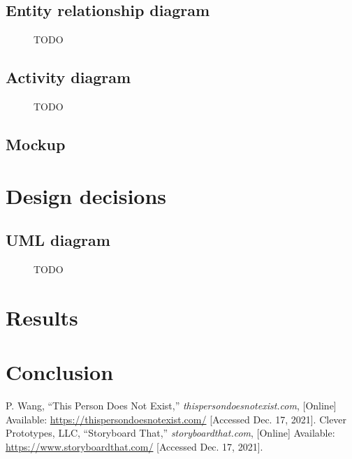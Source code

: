 \documentclass[conference]{IEEEtran}
\begin{document}
\subsection{Entity relationship diagram}

\begin{figure}[H]
	\centerline{}
	\caption{TODO}
	\label{fig:entity_relationship_diagram}
\end{figure}

\subsection{Activity diagram}

\begin{figure}[H]
	\centerline{}
	\caption{TODO}
	\label{fig:activity_diagram}
\end{figure}


\subsection{Mockup}

\section{Design decisions}

\subsection{UML diagram}

\begin{figure}[H]
	\centerline{}
	\caption{TODO}
	\label{fig:uml_diagram}
\end{figure}

\section{Results}

\section{Conclusion}


\begin{thebibliography}{00}	
	 P. Wang, ``This Person Does Not Exist,'' \textit{thispersondoesnotexist.com}, [Online] Available: \url{https://thispersondoesnotexist.com/} [Accessed Dec. 17, 2021].
	 Clever Prototypes, LLC, ``Storyboard That,'' \textit{storyboardthat.com}, [Online] Available: \url{https://www.storyboardthat.com/} [Accessed Dec. 17, 2021].
\end{thebibliography}
\end{document}
